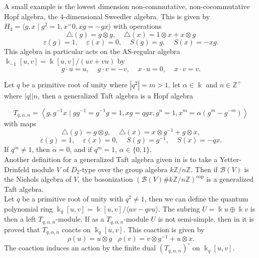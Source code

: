\documentclass[12pt,a4paper]{article}
\newcommand\ZZ{\mathbb{Z}}
\newcommand\BB{\mathcal{B}}
\newcommand{\kk}{\Bbbk}
\newcommand\1{_{(1)}}
\newcommand\2{_{(2)}}
\begin{document}
A small example is the lowest dimension non-commutative, non-cocommutative Hopf algebra, the 4-dimensional Sweedler algebra.
This is given by $H_4=\langle g,x\;\vert\; g^2=1, x^=0, xg=-gx\rangle$ with operations
\[
\triangle(g)=g\otimes g,\;\;\;\; \triangle(x)=1\otimes x+x\otimes g    
\]
\[
\varepsilon(g)=1,\;\;\;\; \varepsilon(x)=0,\;\;\;\; S(g)=g, \;\;\;\; S(x)=-xg.    
\]
This algebra in particular acts on the AS-regular algebra $\kk_{-1}[u,v]=\kk[u,v]/(uv+vu)$ by
\[
g\cdot u=u,\;\;\;\; g\cdot v=-v,\;\;\;\; x\cdot u=0,\;\;\;\; x\cdot v=v.    
\]

Let $q$ be a primitive root of unity where $|q^2| =m>1$, let $\alpha\in \kk$ and $n\in \ZZ^+$ where $|q| \big\vert n$, then a generalized Taft algebra is a Hopf algebra 

\[T_{q,\alpha,n}=\left<g,g^{-1}x\;\vert\; gg^{-1}=g^{-1}g=1, xg=q gx, g^n=1, x^m=\alpha(g^m-g^{-m})\right>
\]
with maps
\[
\triangle(g)=g\otimes g,\;\;\;\; \triangle(x)=x\otimes g^{-1}+g\otimes x,
\]
\[
\varepsilon(g)=1,\;\;\;\;\varepsilon(x)=0,\;\;\;\; S(g)=g^{-1},\;\;\;\; S(x)=-q x.
\]
If $q^m\neq 1$, then $\alpha=0$, and if $q^m=1$, $\alpha\in\{0,1\}$.\\

Another definition for a generalized Taft algebra given in \cite{AS} is to take a Yetter-Drinfeld module $V$ of $D_2$-type over the group algebra $k\ZZ/n\ZZ$. 
Then if $\BB(V)$ is the Nichols algebra of $V$, the bosonization $(\BB(V)\#k\ZZ/n\ZZ)^\text{cop}$ is a generalized Taft algebra.\\

Let $q$ be a primitive root of unity with $q^2\neq 1$, then we can define the quantum polynomial ring $\kk_q[u,v]=\kk[u,v]/\langle uv-qvu\rangle$.
The subring $U=\kk u\oplus \kk v$ is then a left $T_{q,\alpha,n}$-module.
If as a $T_{q,\alpha,n}$-module $U$ is not semi-simple, then in \cite{CKWZ} it is proved that $T_{q,\alpha,n}$ coacts on $\kk_q[u,v]$.
This coaction is given by 
\[
\rho(u)=u\otimes g\;\;\;
\rho(v)=v\otimes g^{-1}+u\otimes x.
\]
The coaction induces an action by the finite dual $\left(T_{q,\alpha,n}\right)^\circ$ on $\kk_q[u,v]$.
\end{document}
